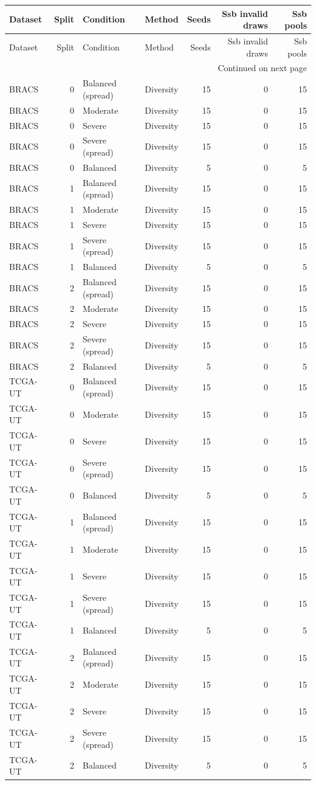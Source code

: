 \begin{longtable}{lrllrrr}
\toprule
Dataset & Split & Condition & Method & Seeds & Ssb invalid draws & Ssb pools \\
\midrule
\endfirsthead
\toprule
Dataset & Split & Condition & Method & Seeds & Ssb invalid draws & Ssb pools \\
\midrule
\endhead
\midrule
\multicolumn{7}{r}{Continued on next page} \\
\midrule
\endfoot
\bottomrule
\endlastfoot
BRACS & 0 & Balanced (spread) & Diversity & 15 & 0 & 15 \\
BRACS & 0 & Moderate & Diversity & 15 & 0 & 15 \\
BRACS & 0 & Severe & Diversity & 15 & 0 & 15 \\
BRACS & 0 & Severe (spread) & Diversity & 15 & 0 & 15 \\
BRACS & 0 & Balanced & Diversity & 5 & 0 & 5 \\
BRACS & 1 & Balanced (spread) & Diversity & 15 & 0 & 15 \\
BRACS & 1 & Moderate & Diversity & 15 & 0 & 15 \\
BRACS & 1 & Severe & Diversity & 15 & 0 & 15 \\
BRACS & 1 & Severe (spread) & Diversity & 15 & 0 & 15 \\
BRACS & 1 & Balanced & Diversity & 5 & 0 & 5 \\
BRACS & 2 & Balanced (spread) & Diversity & 15 & 0 & 15 \\
BRACS & 2 & Moderate & Diversity & 15 & 0 & 15 \\
BRACS & 2 & Severe & Diversity & 15 & 0 & 15 \\
BRACS & 2 & Severe (spread) & Diversity & 15 & 0 & 15 \\
BRACS & 2 & Balanced & Diversity & 5 & 0 & 5 \\
TCGA-UT & 0 & Balanced (spread) & Diversity & 15 & 0 & 15 \\
TCGA-UT & 0 & Moderate & Diversity & 15 & 0 & 15 \\
TCGA-UT & 0 & Severe & Diversity & 15 & 0 & 15 \\
TCGA-UT & 0 & Severe (spread) & Diversity & 15 & 0 & 15 \\
TCGA-UT & 0 & Balanced & Diversity & 5 & 0 & 5 \\
TCGA-UT & 1 & Balanced (spread) & Diversity & 15 & 0 & 15 \\
TCGA-UT & 1 & Moderate & Diversity & 15 & 0 & 15 \\
TCGA-UT & 1 & Severe & Diversity & 15 & 0 & 15 \\
TCGA-UT & 1 & Severe (spread) & Diversity & 15 & 0 & 15 \\
TCGA-UT & 1 & Balanced & Diversity & 5 & 0 & 5 \\
TCGA-UT & 2 & Balanced (spread) & Diversity & 15 & 0 & 15 \\
TCGA-UT & 2 & Moderate & Diversity & 15 & 0 & 15 \\
TCGA-UT & 2 & Severe & Diversity & 15 & 0 & 15 \\
TCGA-UT & 2 & Severe (spread) & Diversity & 15 & 0 & 15 \\
TCGA-UT & 2 & Balanced & Diversity & 5 & 0 & 5 \\
\end{longtable}
